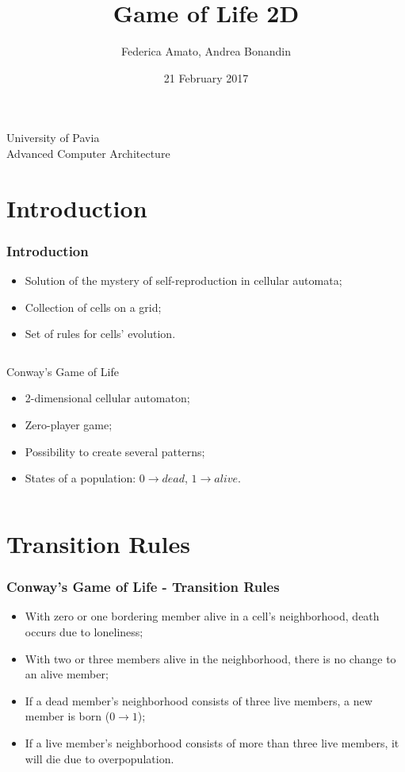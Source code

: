 \documentclass{beamer}
\begin{document}
\title{Game of Life 2D}
\author{Federica Amato, Andrea Bonandin}
\date{21 February 2017}

\begin{frame}
	\begin{center}
		\Large{University of Pavia \\
		Advanced Computer Architecture}
	\end{center}
	\titlepage
\end{frame}

\section{Introduction}
\begin{frame}
	\frametitle{Introduction}
	\begin{itemize}
				\item Solution of the mystery of self-reproduction in cellular automata;
				\item Collection of cells on a grid;
				\item Set of rules for cells' evolution.
	\end{itemize}
	\vfill
	\begin{columns}
		\begin{block}{Conway's Game of Life}
			\begin{itemize}
				\item 2-dimensional cellular automaton;
				\item Zero-player game;
				\item Possibility to create several patterns;
				\item States of a population: $0 \rightarrow dead$, $1 \rightarrow alive$.
			\end{itemize}
		\end{block}
	\end{columns}
\end{frame}

\section{Transition Rules}
\begin{frame}
	\frametitle{Conway's Game of Life - Transition Rules}
	\begin{itemize}
		\item With zero or one bordering member alive in a cell's neighborhood, death occurs due to loneliness;
		\item With two or three members alive in the neighborhood, there is no change to an alive member;
		\item If a dead member's neighborhood consists of three live members, a new member is born ($0 \rightarrow 1$);
		\item If a live member's neighborhood consists of more than three live members, it will die due to overpopulation.
	\end{itemize}
\end{frame}
\end{document}
